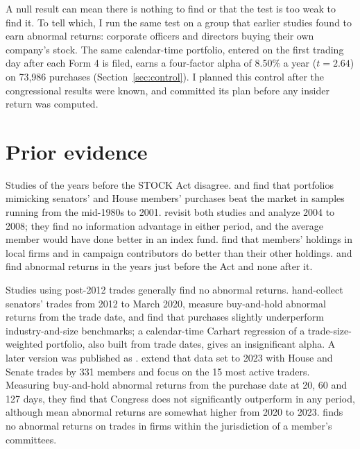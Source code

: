 \documentclass[11pt]{article}
\begin{document}
A null result can mean there is nothing to find or that the test is too weak to find it. To tell which, I run the same test on a group that earlier studies found to earn abnormal returns: corporate officers and directors buying their own company's stock. The same calendar-time portfolio, entered on the first trading day after each Form 4 is filed, earns a four-factor alpha of 8.50\% a year ($t = 2.64$) on 73,986 purchases (Section~\ref{sec:control}). I planned this control after the congressional results were known, and committed its plan before any insider return was computed.

\section{Prior evidence}\label{sec:literature}

Studies of the years before the STOCK Act disagree. \citet{ziobrowski2004senate} and \citet{ziobrowski2011house} find that portfolios mimicking senators' and House members' purchases beat the market in samples running from the mid-1980s to 2001. \citet{eggers2013capitol} revisit both studies and analyze 2004 to 2008; they find no information advantage in either period, and the average member would have done better in an index fund. \citet{eggers2014political} find that members' holdings in local firms and in campaign contributors do better than their other holdings. \citet{karadas2019trading} and \citet{huang2016trading} find abnormal returns in the years just before the Act and none after it.

Studies using post-2012 trades generally find no abnormal returns. \citet{belmont2020relief} hand-collect senators' trades from 2012 to March 2020, measure buy-and-hold abnormal returns from the trade date, and find that purchases slightly underperform industry-and-size benchmarks; a calendar-time Carhart regression of a trade-size-weighted portfolio, also built from trade dates, gives an insignificant alpha. A later version was published as \citet{belmont2022senators}. \citet{fischer2025democracy} extend that data set to 2023 with House and Senate trades by 331 members and focus on the 15 most active traders. Measuring buy-and-hold abnormal returns from the purchase date at 20, 60 and 127 days, they find that Congress does not significantly outperform in any period, although mean abnormal returns are somewhat higher from 2020 to 2023. \citet{zhou2026illusion} finds no abnormal returns on trades in firms within the jurisdiction of a member's committees.
\end{document}
